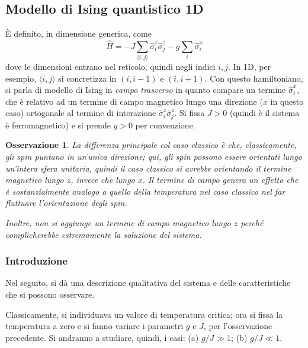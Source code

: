 \documentclass[11pt, a4paper]{scrartcl}
\theoremstyle{style}
\newtheorem{osservazione}{Osservazione}[section]
\theoremstyle{style1}
\newenvironment{boxenv}[1][]{
    \begin{eqbox}[#1]
    }{
   \end{eqbox}
}
\numberwithin{equation}{subsection}
\begin{document}
\subsection{Modello di Ising quantistico 1D}
\`E definito, in dimensione generica, come
\[
\hat{H} = - J \sum_{\langle i,j \rangle}^{} \hat{\sigma }_i ^z \hat{\sigma }_j^z - g \sum_{i}^{} \hat{\sigma }^x_i
\] 
dove le dimensioni entrano nel reticolo, quindi negli indici $i,j$. 
In 1D, per esempio, $\langle i,j \rangle$ si concretizza in $(i,i-1)$ e $(i,i+1)$.
Con questo hamiltoniano, si parla di modello di Ising in \textit{campo trasverso} in quanto compare un termine $\hat{\sigma }^x_i$, che \`e relativo ad un termine di campo magnetico lungo una direzione ($x$ in questo caso) ortogonale al termine di interazione $\hat{\sigma }^z_i\hat{\sigma} ^z_j$.
Si fissa $J>0$ (quindi \`e il sistema \`e ferromagnetico) e si prende $g>0$ per convenzione.
\begin{osservazione}
La differenza principale col caso classico \`e che, classicamente, gli spin puntano in un'unica direzione; qui, gli spin possono essere orientati lungo un'intera sfera unitaria, quindi il caso classico si avrebbe orientando il termine magnetico lungo $z$, invece che lungo $x$.
Il termine di campo genera un effetto che \`e sostanzialmente analogo a quello della temperatura nel caso classico nel far fluttuare l'orientazione degli spin.

Inoltre, non si aggiunge un termine di campo magnetico lungo $z$ perch\'e complicherebbe estremamente la soluzione del sistema.
\end{osservazione}
\subsubsection{Introduzione}
\begin{boxenv}[]
\centering Nel seguito, si d\`a una descrizione qualitativa del sistema e delle caratteristiche che si possono osservare.
\end{boxenv}
\noindent Classicamente, si individuava un valore di temperatura critica; ora si fissa la temperatura a zero e si fanno variare i parametri $g$ e $J$, per l'osservazione precedente.
Si andranno a studiare, quindi, i casi: (a) $g / J \gg 1$; (b) $g / J \ll 1$.
\vspace{.5cm}
\end{document}
